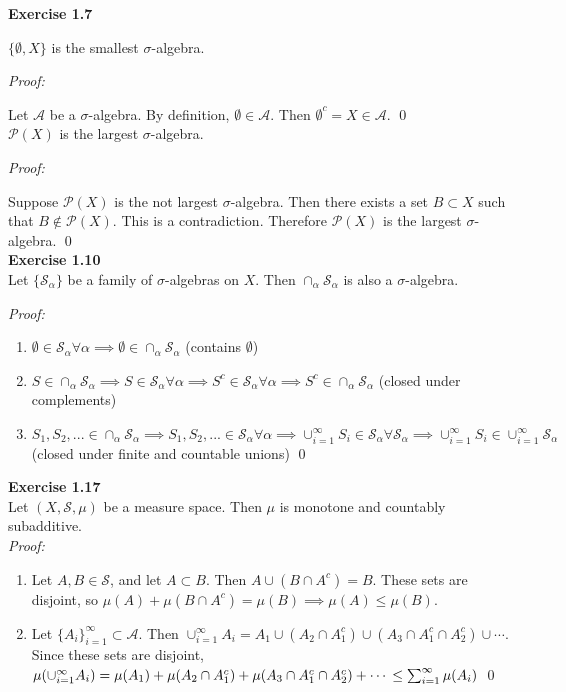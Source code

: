 \documentclass[letterpaper,12pt]{article}
\theoremstyle{definition}
\begin{document}
\textbf{Exercise 1.7}

$\{\emptyset, X\}$ is the smallest $\sigma$-algebra.

\textit{Proof:}

Let $\mathcal{A}$ be a $\sigma$-algebra. By definition, $\emptyset \in \mathcal{A}$. Then $\emptyset^c = X \in \mathcal{A}$. \qed\\

$\mathcal{P}(X)$ is the largest $\sigma$-algebra.

\textit{Proof:}

Suppose $\mathcal{P}(X)$ is the not largest $\sigma$-algebra. Then there exists a set $B \subset X$ such that $B \not\in \mathcal{P}(X)$. This is a contradiction. Therefore $\mathcal{P}(X)$ is the largest $\sigma$-algebra. \qed \\

\textbf{Exercise 1.10} \\
Let $\{\mathcal{S}_\alpha\}$ be a family of $\sigma$-algebras on $X$. Then $\cap_\alpha \mathcal{S_\alpha}$ is also a $\sigma$-algebra.

\textit{Proof:}

\begin{enumerate}
\item $\emptyset \in \mathcal{S}_\alpha \forall \alpha \implies \emptyset \in \cap_\alpha \mathcal{S}_\alpha$ (contains $\emptyset$)
\item $S \in \cap_\alpha \mathcal{S}_\alpha \implies S \in \mathcal{S}_\alpha \forall \alpha \implies S^c \in \mathcal{S}_\alpha \forall \alpha \implies S^c \in \cap_\alpha \mathcal{S}_\alpha$ (closed under complements)
\item $S_1, S_2,... \in \cap_\alpha \mathcal{S}_\alpha \implies S_1, S_2,... \in \mathcal{S}_\alpha \forall \alpha \implies \cup_{i=1}^\infty S_i \in \mathcal{S}_\alpha \forall \mathcal{S}_\alpha \implies \cup_{i=1}^\infty S_i \in \cup_{i=1}^\infty \mathcal{S}_\alpha$ (closed under finite and countable unions) \qed
\end{enumerate}

\textbf{Exercise 1.17} \\
Let $(X, \mathcal{S}, \mu)$ be a measure space. Then $\mu$ is monotone and countably subadditive.\\
\textit{Proof:}
\begin{enumerate}
\item Let $A, B \in \mathcal{S}$, and let $A \subset B$. Then $A \cup (B \cap A^c) = B$. These sets are disjoint, so $\mu(A) + \mu(B \cap A^c) = \mu(B) \implies \mu(A) \leq \mu(B)$.
\item Let $\{A_i\}_{i=1}^\infty \subset \mathcal{A}$. Then $\cup_{i=1}^\infty A_i = A_1 \cup (A_2 \cap A_1^c) \cup (A_3 \cap A_1^c \cap A_2^c) \cup \cdots$. Since these sets are disjoint, $\mu(\cup_{i=1}^\infty A_i) = \mu(A_1) + \mu(A_2 \cap A_1^c) + \mu(A_3 \cap A_1^c \cap A_2^c) + \cdots\\
\leq \sum_{i=1}^\infty \mu(A_i)$ \qed
\end{enumerate}
\end{document}
